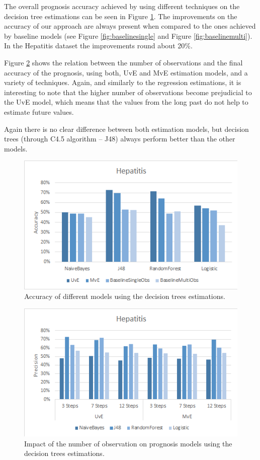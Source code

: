 The overall prognosis accuracy achieved by using different techniques on the decision tree estimations can be seen in Figure \ref{fig:accuracytree}.
The improvements on the accuracy of our approach are always present when compared to the ones achieved by baseline models 
(see Figure \ref{fig:baselinesingle} and Figure \ref{fig:baselinemulti}). In the Hepatitis dataset the improvements round about 20\%.

Figure \ref{fig:impactobservationstree} shows the relation between the number of observations and the final accuracy of the prognosis, using both, UvE and MvE estimation models, and a variety of techniques. Again, and similarly to the regression estimations, it is interesting to note that the higher number of observations become prejudicial to the UvE model, which means that the values from the long past do not help to estimate future values. 

Again there is no clear difference between both estimation models, but decision trees (through C4.5 algorithm – J48) always 
perform better than the other models. 

\begin{figure}[h]
	\centering
  \includegraphics[width=0.49\linewidth]{Figures/accuracy_h_tree.png}
  \caption{Accuracy of different models using the decision trees estimations.}
  \label{fig:accuracytree}
\end{figure}

 \begin{figure}[h]
	\centering
	\includegraphics[width=0.49\linewidth]{Figures/impact_h_tree.png}
  \caption{Impact of the number of observation on prognosis models using the decision trees estimations.}
  \label{fig:impactobservationstree}
\end{figure}

